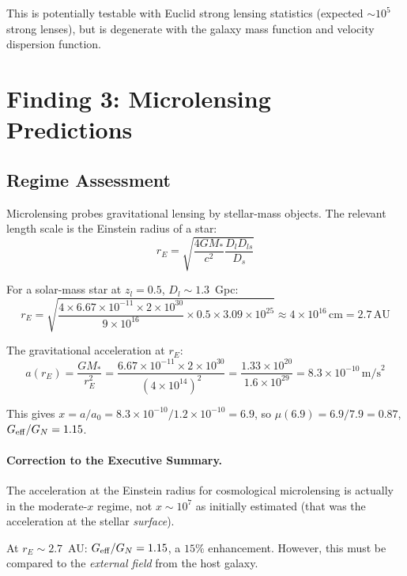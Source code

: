 \documentclass[11pt,a4paper]{article}
\newcommand{\Geff}{G_{\rm eff}}
\newcommand{\ee}[1]{\times 10^{#1}}
\begin{document}
This is potentially testable with Euclid strong lensing statistics
(expected $\sim 10^5$ strong lenses), but is degenerate with the
galaxy mass function and velocity dispersion function.


\section{Finding 3: Microlensing Predictions}
\label{sec:microlensing}

\subsection{Regime Assessment}

Microlensing probes gravitational lensing by stellar-mass objects.
The relevant length scale is the Einstein radius of a star:
\begin{equation}
r_E = \sqrt{\frac{4GM_*}{c^2} \frac{D_l D_{ls}}{D_s}}
\end{equation}

For a solar-mass star at $z_l = 0.5$, $D_l \sim 1.3$~Gpc:
\begin{equation}
r_E = \sqrt{\frac{4 \times 6.67\ee{-11} \times 2\ee{30}}{9\ee{16}}
\times 0.5 \times 3.09\ee{25}} \approx 4\ee{16}\,\text{cm}
= 2.7\,\text{AU}
\end{equation}

The gravitational acceleration at $r_E$:
\begin{equation}
a(r_E) = \frac{GM_*}{r_E^2} = \frac{6.67\ee{-11} \times 2\ee{30}}
{(4\ee{14})^2} = \frac{1.33\ee{20}}{1.6\ee{29}} = 8.3\ee{-10}\,\text{m/s}^2
\end{equation}

This gives $x = a/a_0 = 8.3\ee{-10}/1.2\ee{-10} = 6.9$, so
$\mu(6.9) = 6.9/7.9 = 0.87$, $\Geff/G_N = 1.15$.

\paragraph{Correction to the Executive Summary.}
The acceleration at the Einstein radius for cosmological microlensing
is actually in the moderate-$x$ regime, not $x \sim 10^7$ as initially
estimated (that was the acceleration at the stellar \emph{surface}).

At $r_E \sim 2.7$~AU: $\Geff/G_N = 1.15$, a $15\%$ enhancement.
However, this must be compared to the \emph{external field} from the
host galaxy.
\end{document}
